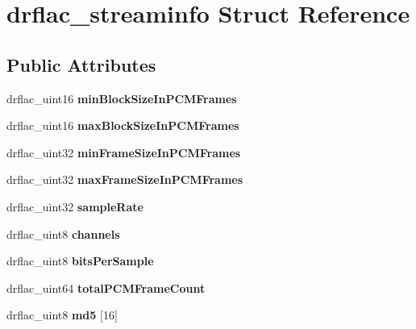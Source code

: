 \hypertarget{structdrflac__streaminfo}{\section{drflac\-\_\-streaminfo Struct Reference}
\label{structdrflac__streaminfo}
}
\subsection*{Public Attributes}
\begin{DoxyCompactItemize}
\item 
\hypertarget{structdrflac__streaminfo_ae23901b3475a5a1cc1c352263e439b0c}{drflac\-\_\-uint16 {\bfseries min\-Block\-Size\-In\-P\-C\-M\-Frames}}\label{structdrflac__streaminfo_ae23901b3475a5a1cc1c352263e439b0c}

\item 
\hypertarget{structdrflac__streaminfo_a23a35f161c9aab1b65654272175b3020}{drflac\-\_\-uint16 {\bfseries max\-Block\-Size\-In\-P\-C\-M\-Frames}}\label{structdrflac__streaminfo_a23a35f161c9aab1b65654272175b3020}

\item 
\hypertarget{structdrflac__streaminfo_a351d7511e24823bcea65456a300ea675}{drflac\-\_\-uint32 {\bfseries min\-Frame\-Size\-In\-P\-C\-M\-Frames}}\label{structdrflac__streaminfo_a351d7511e24823bcea65456a300ea675}

\item 
\hypertarget{structdrflac__streaminfo_abc0bb267b7aff3e042049cb9353802ac}{drflac\-\_\-uint32 {\bfseries max\-Frame\-Size\-In\-P\-C\-M\-Frames}}\label{structdrflac__streaminfo_abc0bb267b7aff3e042049cb9353802ac}

\item 
\hypertarget{structdrflac__streaminfo_a28becd2dbabf6540dbcbe85edbaa76e2}{drflac\-\_\-uint32 {\bfseries sample\-Rate}}\label{structdrflac__streaminfo_a28becd2dbabf6540dbcbe85edbaa76e2}

\item 
\hypertarget{structdrflac__streaminfo_a74dbd7ad0178e57d1449f5215ba154ac}{drflac\-\_\-uint8 {\bfseries channels}}\label{structdrflac__streaminfo_a74dbd7ad0178e57d1449f5215ba154ac}

\item 
\hypertarget{structdrflac__streaminfo_ad17d8d915075a873f98defdcdcf709b8}{drflac\-\_\-uint8 {\bfseries bits\-Per\-Sample}}\label{structdrflac__streaminfo_ad17d8d915075a873f98defdcdcf709b8}

\item 
\hypertarget{structdrflac__streaminfo_a95692d2d333d43910c59d55d17f0cae6}{drflac\-\_\-uint64 {\bfseries total\-P\-C\-M\-Frame\-Count}}\label{structdrflac__streaminfo_a95692d2d333d43910c59d55d17f0cae6}

\item 
\hypertarget{structdrflac__streaminfo_ad68ebae74dffde9d41acfe4218f23dba}{drflac\-\_\-uint8 {\bfseries md5} \mbox{[}16\mbox{]}}\label{structdrflac__streaminfo_ad68ebae74dffde9d41acfe4218f23dba}

\end{DoxyCompactItemize}


